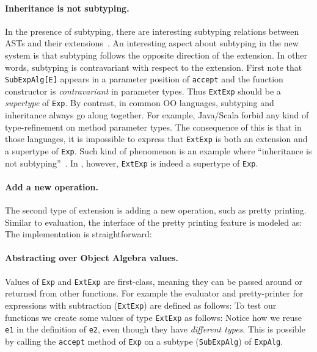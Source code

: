 \paragraph{Inheritance is not subtyping.} In the presence of subtyping, there
are interesting subtyping relations between ASTs and their
extensions~\cite{oliveira09modular}. An interesting aspect about subtyping in
the new system is that subtyping follows the opposite direction of the
extension. In other words, subtyping is contravariant with respect to the
extension. First note that \lstinline{SubExpAlg[E]} appears in a parameter
position of \lstinline{accept} and the function constructor is
\textit{contravariant} in parameter types. Thus \lstinline{ExtExp} should be a
\textit{supertype} of \lstinline{Exp}. By contrast, in common OO languages,
subtyping and inheritance always go along together. For example, Java/Scala
forbid any kind of type-refinement on method parameter types. The consequence of
this is that in those languages, it is impossible to express that
\lstinline{ExtExp} is both an extension and a supertype of \lstinline{Exp}. Such
kind of phenomenon is an example where ``inheritance is not
subtyping''~\cite{cook1989inheritance}. In \name, however, \lstinline{ExtExp} is
indeed a supertype of \lstinline{Exp}.

\paragraph{Add a new operation.} The second type of extension is adding a new
operation, such as pretty printing. Similar to evaluation, the interface of the
pretty printing feature is modeled as:
The implementation is straightforward:

\paragraph{Abstracting over Object Algebra values.} Values of \lstinline{Exp} and
\lstinline{ExtExp} are first-class, meaning they can be passed around or
returned from other functions. For example the evaluator and
pretty-printer for expressions with subtraction (\lstinline{ExtExp}) are defined as follows:
To test our functions we create some values of type \lstinline{ExtExp} as follows:
Notice how we reuse \lstinline{e1} in the definition of
\lstinline{e2}, even though they have \emph{different types}. This is 
possible by calling the \lstinline{accept}
method of \lstinline{Exp} on a subtype (\lstinline{SubExpAlg})
of \lstinline{ExpAlg}.

